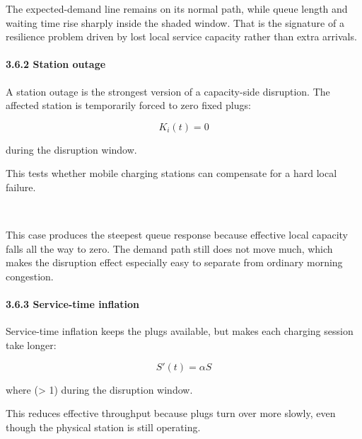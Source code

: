 \documentclass[11pt]{article}
\begin{document}
    The expected-demand line remains on its normal path, while queue length
and waiting time rise sharply inside the shaded window. That is the
signature of a resilience problem driven by lost local service capacity
rather than extra arrivals.

    \paragraph{3.6.2 Station outage}\label{station-outage}

A station outage is the strongest version of a capacity-side disruption.
The affected station is temporarily forced to zero fixed plugs:

\[
K_i(t) = 0
\]

during the disruption window.

This tests whether mobile charging stations can compensate for a hard
local failure.

    \begin{center}
    \end{center}
    { \hspace*{\fill} \\}
    
    This case produces the steepest queue response because effective local
capacity falls all the way to zero. The demand path still does not move
much, which makes the disruption effect especially easy to separate from
ordinary morning congestion.

    \paragraph{3.6.3 Service-time inflation}\label{service-time-inflation}

Service-time inflation keeps the plugs available, but makes each
charging session take longer:

\[
S'(t) = \alpha S
\]

where (\alpha \textgreater{} 1) during the disruption window.

This reduces effective throughput because plugs turn over more slowly,
even though the physical station is still operating.

    \begin{center}
    \end{center}
    { \hspace*{\fill} \\}
    
\end{document}

